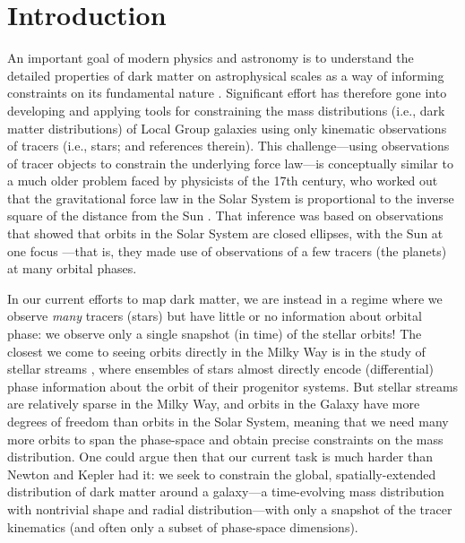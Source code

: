 \documentclass[modern]{aastex63}
\begin{document}
\section{Introduction}
\label{sec:intro}

An important goal of modern physics and astronomy is to understand the detailed
properties of dark matter on astrophysical scales as a way of informing
constraints on its fundamental nature \citep[see, e.g., recent reviews
by][]{Bullock:2017, Buckley:2018}.
Significant effort has therefore gone into developing and applying tools for
constraining the mass distributions (i.e., dark matter distributions) of Local
Group galaxies using only kinematic observations of tracers (i.e., stars;
\citealt{Jeans:1919b, Binney:2008} and references therein).
This challenge---using observations of tracer objects to constrain the
underlying force law---is conceptually similar to a much older problem faced by
physicists of the 17th century, who worked out that the gravitational force law
in the Solar System is proportional to the inverse square of the distance from
the Sun \citep{Newton:1687}.
That inference was based on observations that showed that orbits in the Solar
System are closed ellipses, with the Sun at one focus \citep{Kepler:1609}---that
is, they made use of observations of a few tracers (the planets) at many orbital
phases.

In our current efforts to map dark matter, we are instead in a regime where we
observe \emph{many} tracers (stars) but have little or no information about
orbital phase: we observe only a single snapshot (in time) of the stellar
orbits!
The closest we come to seeing orbits directly in the Milky Way is in the study
of stellar streams \citep[e.g.,][]{Johnston:1999, Helmi:1999, Eyre:2011,
Sanders:2013, Price-Whelan:2014, Bonaca:2018}, where ensembles of stars almost
directly encode (differential) phase information about the orbit of their
progenitor systems.
But stellar streams are relatively sparse in the Milky Way, and orbits in the
Galaxy have more degrees of freedom than orbits in the Solar System, meaning
that we need many more orbits to span the phase-space and obtain precise
constraints on the mass distribution.
One could argue then that our current task is much harder than Newton and Kepler
had it:
we seek to constrain the global, spatially-extended distribution of dark matter
around a galaxy---a time-evolving mass distribution with nontrivial shape and
radial distribution---with only a snapshot of the tracer kinematics (and often
only a subset of phase-space dimensions).
\end{document}
